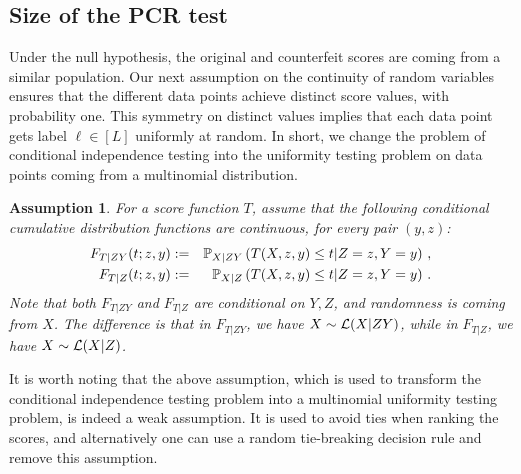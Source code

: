 \documentclass[11pt]{article}
\newtheorem{assumption}[propo]{Assumption}
\begin{document}
 \subsection{Size of the PCR test}\label{sec:size}
 
 
 Under the null hypothesis, the original and counterfeit scores are coming from a similar population. Our next assumption on the continuity of random variables ensures that the different data points achieve distinct score values, with probability one. This symmetry on distinct values implies that each data point gets label $\ell \in[L]$ uniformly at random. In short, we change the problem of conditional independence testing into the uniformity testing problem on data points coming from a multinomial distribution. 

\begin{assumption}\label{assum: mu_mapping}
	For a score function $T$, assume that the following conditional cumulative distribution functions are continuous, for every pair $(y,z)$:
	\begin{eqnarray}
	F_{T|ZY}(t;z,y)&:=&{\mathbb P}_{{X|ZY}}\left(T(X,z,y)\leq t|Z=z,Y=y\right)\,,\label{eq:FZY}\\
	F_{T|Z}(t;z,y)&:=&{\mathbb P}_{{X|Z}}\left(T(X,z,y)\leq t|Z=z,Y=y\right)\,.\label{eq:FZ}
	\end{eqnarray}
	Note that both $F_{T|ZY}$ and $F_{T|Z}$ are conditional on $Y,Z$, and randomness is coming from $X$. The difference is that in $F_{T|ZY}$, we have $X\sim \mathcal{L}(X|ZY)$, while in $F_{T|Z}$, we have $X\sim \mathcal{L}(X|Z)$.  
\end{assumption}	


It is worth noting that the above assumption, which is used to transform the conditional independence testing problem into a multinomial uniformity testing problem, is indeed a weak assumption. It is used to avoid ties when ranking the scores, and alternatively one can use a random tie-breaking decision rule and remove this assumption.  
\end{document}
